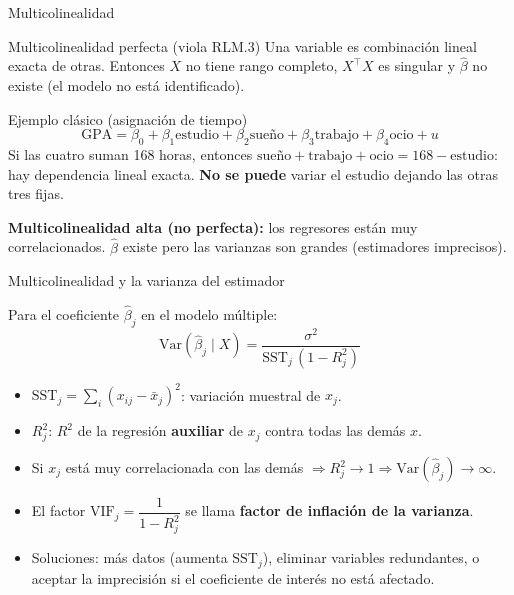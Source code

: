 \documentclass{beamer}
\begin{document}
\begin{frame}{Multicolinealidad}

\begin{block}{Multicolinealidad perfecta (viola RLM.3)}
Una variable es combinación lineal exacta de otras. Entonces $X$ no tiene rango completo, $X^{\top}X$ es singular y $\hat{\beta}$ \alert{no existe} (el modelo no está identificado).
\end{block}

\pause

\begin{exampleblock}{Ejemplo clásico (asignación de tiempo)}
\[
\text{GPA} = \beta_0 + \beta_1\text{estudio} + \beta_2\text{sueño} + \beta_3\text{trabajo} + \beta_4\text{ocio} + u
\]
Si las cuatro suman 168 horas, entonces $\text{sueño}+\text{trabajo}+\text{ocio}=168-\text{estudio}$: hay dependencia lineal exacta. \textbf{No se puede} variar el estudio dejando las otras tres fijas.
\end{exampleblock}

\pause

\textbf{Multicolinealidad alta (no perfecta):} los regresores están muy correlacionados. $\hat{\beta}$ existe pero las varianzas son \alert{grandes} (estimadores imprecisos).
\end{frame}

\begin{frame}{Multicolinealidad y la varianza del estimador}

Para el coeficiente $\hat{\beta}_j$ en el modelo múltiple:
\[
\text{Var}(\hat{\beta}_j\mid X) = \frac{\sigma^2}{\text{SST}_j \,(1 - R_j^2)}
\]
\begin{itemize}
    \item $\text{SST}_j = \sum_i (x_{ij}-\bar{x}_j)^2$: variación muestral de $x_j$.
    \item $R_j^2$: $R^2$ de la regresión \textbf{auxiliar} de $x_j$ contra todas las demás $x$.
\end{itemize}

\pause

\begin{itemize}
    \item Si $x_j$ está muy correlacionada con las demás $\Rightarrow R_j^2 \to 1 \Rightarrow \text{Var}(\hat{\beta}_j)\to\infty$.
    \item El factor $\text{VIF}_j = \dfrac{1}{1-R_j^2}$ se llama \textbf{factor de inflación de la varianza}.
    \item Soluciones: más datos (aumenta $\text{SST}_j$), eliminar variables redundantes, o aceptar la imprecisión si el coeficiente de interés no está afectado.
\end{itemize}
\end{frame}
\end{document}
